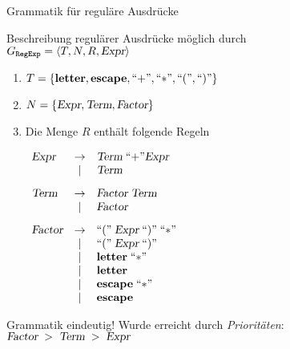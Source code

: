 \begin{slide}{}
\normalsize

\begin{center}
Grammatik f\"ur regul\"are Ausdr\"ucke
\end{center}
\vspace*{0.5cm}

\footnotesize
Beschreibung regul\"arer Ausdr\"ucke m\"oglich durch \\[0.3cm]
\hspace*{1.3cm} $G_{\mathtt{RegExp}} = \langle T, N, R, \textsl{Expr} \rangle$
\begin{enumerate}
\item $T = \{ \mathbf{letter}, \mathbf{escape}, ``\mathtt{+}\symbol{34},  ``\mathtt{*}\cq, ``\mathtt{(}\cq, ``\mathtt{)}\cq\}$
\item $N = \{ \textsl{Expr}, \textsl{Term}, \textsl{Factor} \}$
\item Die Menge $R$ enth\"alt folgende Regeln 

      $\begin{array}{lcl}
       \textsl{Expr} & \rightarrow & \textsl{Term}\; ``\mathtt{+}\cq \textsl{Expr} \\
                     & |           & \textsl{Term}                                 \\[0.3cm]
       \textsl{Term} & \rightarrow & \textsl{Factor}\;\textsl{Term}                  \\
                     & |           & \textsl{Factor}                                 \\[0.3cm]
       \textsl{Factor} & \rightarrow & ``\mathtt{(}\cq \;\textsl{Expr}\; ``\mathtt{)}\cq \; ``\mathtt{*}\cq\\
                     & |           & ``\mathtt{(}\cq \;\textsl{Expr}\; ``\mathtt{)}\cq\\
                     & |           & \mathbf{letter}\; ``\mathtt{*}\cq\\
                     & |           & \mathbf{letter}\\
                     & |           & \mathbf{escape}\; ``\mathtt{*}\cq\\
                     & |           & \mathbf{escape}\\
     \end{array}$
\end{enumerate}
Grammatik  eindeutig! Wurde erreicht durch \emph{Priorit\"aten}: \\[0.3cm]
\hspace*{1.3cm}  $\textsl{Factor}\; > \;\textsl{Term}\; > \;\textsl{Expr}$


\end{slide}
